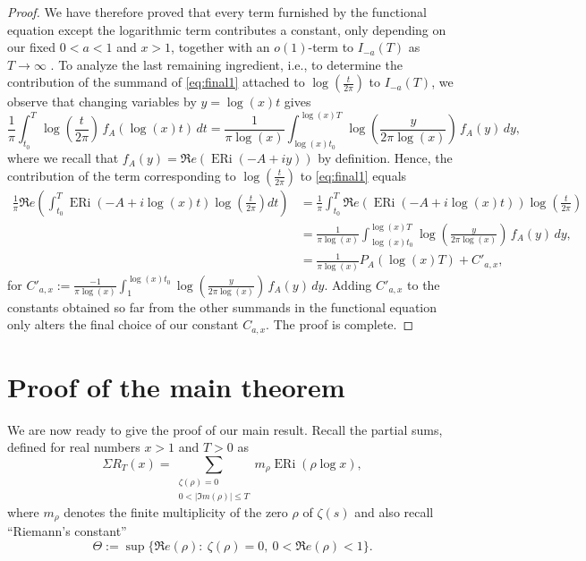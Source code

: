 \documentclass[a4paper,10pt]{amsart}
\DeclareMathOperator{\ERi}{ERi}
\theoremstyle{definition}
\numberwithin{equation}{section}
\begin{document}
\begin{proof}
We have therefore proved that every term furnished by the functional equation except the logarithmic term contributes a constant, only depending on our fixed $0<a<1$ and $x>1$, together with an $o(1)$-term to $I_{-a}(T)$ as $T\to\infty$ . To analyze the last remaining ingredient, i.e., to determine the contribution of the summand of \eqref{eq:final1} attached to $\log\left(\frac{t}{2\pi}\right)$ to $I_{-a}(T)$, we observe that changing variables by $y=\log(x)t$ gives
$$
\frac1\pi\int_{t_0}^T\log\left(\frac{t}{2\pi}\right)\,f_A(\log(x)t)\,dt = \frac1{\pi \log(x)}\int_{\log(x)t_0}^{\log(x)T} \log\left(\frac{y}{2\pi \log(x)}\right)\,f_A(y)\,dy,
$$
where we recall that $f_A(y)=\Re e(\ERi(-A+iy))$ by definition. Hence, the contribution of the term corresponding to $\log\left(\frac{t}{2\pi}\right)$ to \eqref{eq:final1} equals
$$
\begin{aligned}
\frac1\pi \Re e\left(\int_{t_0}^T \ERi(-A+i\log(x)t) \log\left(\frac{t}{2\pi}\right) dt\right) 
&=\frac1\pi \int_{t_0}^T \Re e\left(\ERi(-A+i\log(x)t)\right) \log\left(\frac{t}{2\pi}\right) \\
&=\frac1{\pi \log(x)}\int_{\log(x)t_0}^{\log(x)T} \log\left(\frac{y}{2\pi \log(x)}\right)\,f_A(y)\,dy,\\
&=\frac1{\pi \log(x)} P_A(\log(x)T) + C'_{a,x},
\end{aligned}
$$
for $C'_{a,x}:=\frac{-1}{\pi\log(x)}\int_{1}^{\log(x)t_0}\log\left(\frac{y}{2\pi \log(x)}\right)\,f_A(y)\,dy$. Adding $C'_{a,x}$ to the constants obtained so far from the other summands in the functional equation only alters the final choice of our constant $C_{a,x}$. The proof is complete.
\end{proof}

\section{Proof of the main theorem}\label{sect:proof}
\noindent We are now ready to give the proof of our main result. Recall the partial sums, defined for real numbers $x>1$ and $T>0$ as
$$
\Sigma R_T(x)= \sum_{\substack{\zeta(\rho)=0\\0<|\Im m(\rho)|\le T}} m_\rho\ERi(\rho\log x),
$$
where $m_\rho$ denotes the finite multiplicity of the zero $\rho$ of $\zeta(s)$ and also recall ``Riemann's constant'' 
$$\Theta:=\sup\{\Re e(\rho):\ \zeta(\rho)=0,\ 0<\Re e(\rho)<1\}.$$
\end{document}
